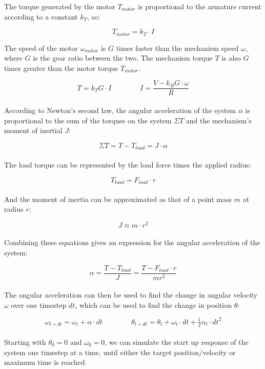 \documentclass[a4paper]{article}
\begin{document}
	The torque generated by the motor $ T_{motor} $ is proportional to the armature current according to a constant $ k_T $, so:
	
	\begin{equation}
		T_{motor} = k_T \cdot I
	\end{equation}
	\newpage
	
	The speed of the motor $ \omega_{motor} $ is $ G $ times faster than the mechanism speed $ \omega $, where $ G $ is the gear ratio between the two. The mechanism torque $ T $ is also $ G $ times greater than the motor torque $ T_{motor} $.
	
	\begin{equation}
		T = k_T G \cdot I \qquad\qquad
		I = \frac{V - k_B G \cdot \omega}{R}
	\end{equation}
	\\
	According to Newton's second law, the angular acceleration of the system $ \alpha $ is proportional to the sum of the torques on the system $ \Sigma T $ and the mechanism's moment of inertial $ J $:
	
	\begin{equation}
		\Sigma T = T - T_{load} = J \cdot \alpha
	\end{equation}
	\\
	The load torque can be represented by the load force times the applied radius:
	
	\begin{equation}
		T_{load} = F_{load} \cdot r
	\end{equation}
	\\
	And the moment of inertia can be approximated as that of a point mass $ m $ at radius $ r $:
	
	\begin{equation}
		J \approx m \cdot r^2
	\end{equation}
	\\
	Combining these equations gives an expression for the angular acceleration of the system:
	
	\begin{equation}
		\alpha = \frac{T - T_{load}}{J} = \frac{T - F_{load} \cdot r}{m r^2}
	\end{equation}
	\\
	The angular acceleration can then be used to find the change in angular velocity $ \omega $ over one timestep $ dt $, which can be used to find the change in position $ \theta $:
	
	\begin{equation}
		\omega_{t+dt} = \omega_t + \alpha \cdot dt \qquad\qquad
		\theta_{t+dt} = \theta_t + \omega_t \cdot dt + \tfrac{1}{2} \alpha_t \cdot {dt}^2
	\end{equation}
	\\
	Starting with $ \theta_0 = 0 $ and $ \omega_0 = 0 $, we can simulate the start up response of the system one timestep at a time, until either the target position/velocity or maximum time is reached.

	
	
	
	
	
\end{document}
